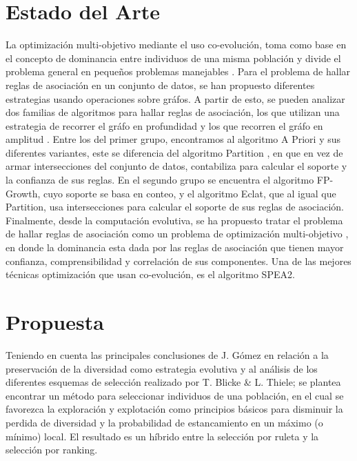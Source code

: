 \documentclass{llncs}
\begin{document}
\section{Estado del Arte}
La optimización multi-objetivo mediante el uso co-evolución, toma como base en el concepto de dominancia entre individuos de una misma población y divide el problema general en pequeños problemas manejables \cite{zitzler:laumans:thiele}. Para el problema de hallar reglas de asociación en un conjunto de datos, se han propuesto diferentes estrategias usando operaciones sobre gráfos. A partir de esto, se pueden analizar dos familias de algoritmos para hallar reglas de asociación, los que utilizan una estrategia de recorrer el gráfo en profundidad y los que recorren el gráfo en amplitud \cite{ma}.
Entre los del primer grupo, encontramos al algoritmo A Priori \cite{Agrawal} y sus diferentes variantes, este se diferencia del algoritmo Partition \cite{savas}, en que en vez de armar intersecciones del conjunto de datos, contabiliza para calcular el soporte y la confianza de sus reglas.
En el segundo grupo se encuentra el algoritmo FP-Growth, cuyo soporte se basa en conteo, y el algoritmo Eclat, que al igual que Partition, usa intersecciones para calcular el soporte de sus reglas de asociación.
Finalmente, desde la computación evolutiva, se ha propuesto tratar el problema de hallar reglas de asociación como un problema de optimización multi-objetivo \cite{hu}, en donde la dominancia esta dada por las reglas de asociación que tienen mayor confianza, comprensibilidad y correlación de sus componentes. 
Una de las mejores técnicas optimización que usan co-evolución, es el algoritmo SPEA2\cite{zitzler:laumans:thiele}.

\section{Propuesta}
Teniendo en cuenta las principales conclusiones de J. Gómez \cite{gomez} en relación a la preservación de la diversidad como estrategia evolutiva y al análisis de los diferentes esquemas de selección realizado por T. Blicke \& L. Thiele\cite{blick:thiele}; se plantea encontrar un método para seleccionar individuos de una población, en el cual se favorezca la  exploración y explotación como principios básicos para disminuir la perdida de diversidad y la probabilidad de estancamiento en un máximo (o mínimo) local. El resultado es un híbrido entre la selección por ruleta y la selección por ranking.
\end{document}
